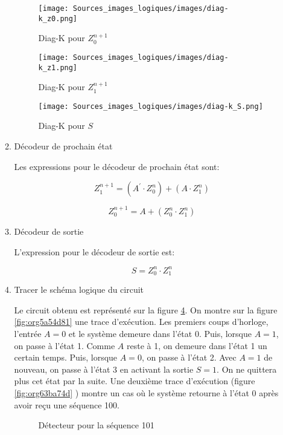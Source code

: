 \documentclass[letter, oneside]{book}
\begin{document}
\begin{enumerate}
\begin{enumerate}
\begin{figure}[htbp]
\centering
\texttt{[image: Sources\_images\_logiques/images/diag-k\_z0.png]}
\caption{\label{fig:org7f90cd1}Diag-K pour \(Z_0^{n+1}\)}
\end{figure}

\begin{figure}[htbp]
\centering
\texttt{[image: Sources\_images\_logiques/images/diag-k\_z1.png]}
\caption{\label{fig:org436e152}Diag-K pour \(Z_1^{n+1}\)}
\end{figure}

\begin{figure}[htbp]
\centering
\texttt{[image: Sources\_images\_logiques/images/diag-k\_S.png]}
\caption{\label{fig:org018ddfb}Diag-K pour \(S\)}
\end{figure}

\item Décodeur de prochain état
\label{sec:org4c65191}

Les expressions pour le décodeur de prochain état sont:

$$ Z_1^{n+1} = (A^\prime \cdot Z_0^{n}) + (A \cdot  Z_1^{n}) $$

$$ Z_0^{n+1} = A + (Z_0^{n} \cdot Z_1^{n}) $$

\item Décodeur de sortie
\label{sec:org669fb17}

L'expression pour le décodeur de sortie est:

$$ S = Z_0^{n} \cdot Z_1^{n} $$

\item Tracer le schéma logique du circuit
\label{sec:org4759f91}

Le circuit obtenu est représenté sur la figure
\ref{fig:org80770dc}. On montre sur la figure
\ref{fig:org5a54d81} une trace d'exécution. Les premiers coups
d'horloge, l'entrée \(A=0\) et le système demeure dans l'état 0. Puis,
lorsque \(A=1\), on passe à l'état 1. Comme \(A\) reste à 1, on
demeure dans l'état 1 un certain temps. Puis, lorsque \(A=0\), on
passe à l'état 2. Avec \(A=1\) de nouveau, on passe à l'état 3 en
activant la sortie \(S=1\). On ne quittera plus cet état par la
suite. Une deuxième trace d'exécution (figure \ref{fig:org63ba74d}
) montre un cas où le système retourne à l'état 0 après avoir reçu une
séquence 100.

\begin{figure}[htbp]
\centering

\caption{\label{fig:org80770dc}Détecteur pour la séquence 101}
\end{figure}


\end{enumerate}
\end{enumerate}
\end{document}
